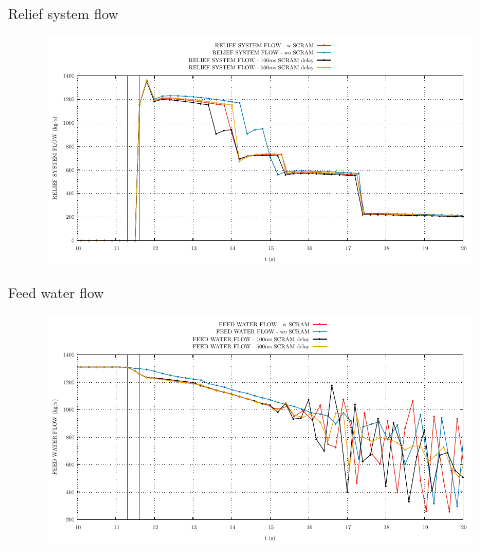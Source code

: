 \begin{frame}{Relief system flow}
	\begin{figure}
		\centering
		\includegraphics[width=\textwidth]{./01PressureAccident/graphs/RELIEF SYSTEM FLOW_comp.pdf}
		
	\end{figure}
	
\end{frame}


\begin{frame}{Feed water flow}
	\begin{figure}
		\centering
		\includegraphics[width=\textwidth]{./01PressureAccident/graphs/FEED WATER FLOW_comp.pdf}
		
	\end{figure}
	
\end{frame}

